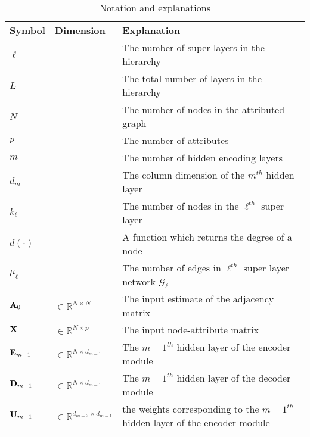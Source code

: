 \documentclass[a4paper,12pt]{article}
\begin{document}
	

\newpage
\appendix
\begin{table}[!ht]
	\centering
	\caption{Notation and explanations}
	\begin{tabular}{p{2cm}|p{3cm}|p{10cm}}
		\toprule[0.08cm]
		\bf Symbol & \centering \bf Dimension & \bf Explanation \\
		\cmidrule(lr){1-3}
		$\ell$ & & The number of super layers in the hierarchy \\
		
		$L$ & & The total number of layers in the hierarchy \\
		
		$N$ & & The number of nodes in the attributed graph \\
		
		$p$ & & The number of attributes \\
		
		$m$ & & The number of hidden encoding layers \\
		
		$d_m$ & & The column dimension of the $m^{th}$ hidden layer \\
		
		$k_\ell$ & & The number of nodes in the $\ell^{th}$ super layer \\
		
		$d(\cdot)$ & & A function which returns the degree of a node \\
		
		$\mu_\ell$ & & The number of edges in $\ell^{th}$ super layer network $\mathcal{G}_{\ell}$ \\
		
		${\bf A}_0$ & $ \in \mathbb{R}^{N \times N}$ & The input estimate of the adjacency matrix \\
		
		${\bf X}$ &$\in \mathbb{R}^{N \times p}$ & The input node-attribute matrix \\
		
		${\bf E}_{m-1}$ & $\in \mathbb{R}^{N \times d_{m-1}}$ & The ${m-1}^{th}$ hidden layer of the encoder module\\
		
		${\bf D}_{m-1}$ & $\in \mathbb{R}^{N \times d_{m-1}}$ & The ${m-1}^{th}$ hidden layer of the decoder module\\
		
		${\bf U}_{m-1}$ & $\in \mathbb{R}^{d_{m-2}\times d_{m-1}}$ & the weights corresponding to the ${m-1}^{th}$ hidden layer of the encoder module \\
		

\end{tabular}
\end{table}
\end{document}
